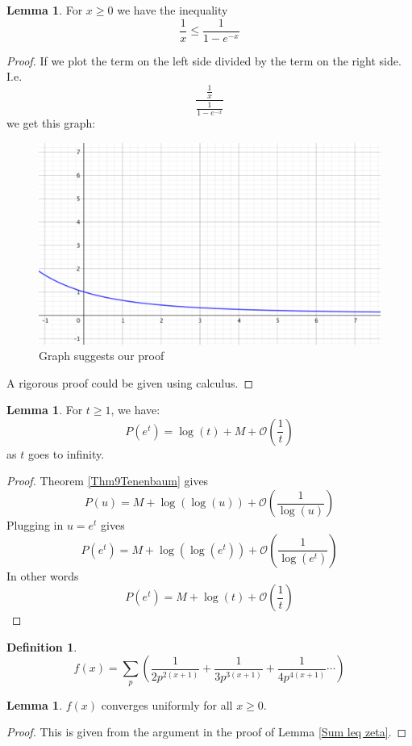\documentclass{article}
\theoremstyle{definition}
\newtheorem{definition}{Definition}[section]
\newtheorem{lemma}[theorem]{Lemma}
\theoremstyle{remark}
\begin{document}
\begin{lemma}\label{alex3}
For $x \geq 0 $ we have the inequality
$$\frac{1}{x} \leq \frac{1}{1-e^{-x}}$$
\end{lemma}
\begin{proof}
If we plot the term on the left side divided by the term on the right side. I.e.
$$ \frac{\frac{1}{x}}{\frac{1}{1-e^{-x}}}$$
we get this graph:
\begin{figure} [H]
\centering\includegraphics[width = 0.7 \textwidth]{Plot-Lemma3-15.png}
\caption{\label{fig: proofLemma3-15} Graph suggests our proof}
\end{figure}
A rigorous proof could be given using calculus.

\end{proof}


\begin{lemma}
For $t\geq1$, we have:
$$P(e^t)=\log(t)+M+\mathcal{O}(\frac{1}{t})$$
as $t$ goes to infinity.
\end{lemma}
\begin{proof}
Theorem \ref{Thm9Tenenbaum} gives
$$P(u)=M+\log(\log(u))+\mathcal{O}(\frac{1}{\log(u)})$$
Plugging in $u=e^t$ gives
$$P(e^t)=M+\log(\log(e^t))+\mathcal{O}(\frac{1}{\log(e^t)})$$
In other words
$$P(e^t)=M+\log(t)+\mathcal{O}(\frac{1}{t})$$
\end{proof}
\begin{definition}
$$f(x)=\sum_p\left(\frac{1}{2p^{2(x+1)}}+\frac{1}{3p^{3(x+1)}}+\frac{1}{4p^{4(x+1)}}\cdots \right)$$
\end{definition}


\begin{lemma}
$f(x)$ converges uniformly for all $x\geq0$.
\end{lemma}
\begin{proof}
This is given from the argument in the proof of Lemma \ref{Sum leq zeta}.
\end{proof}
\end{document}
